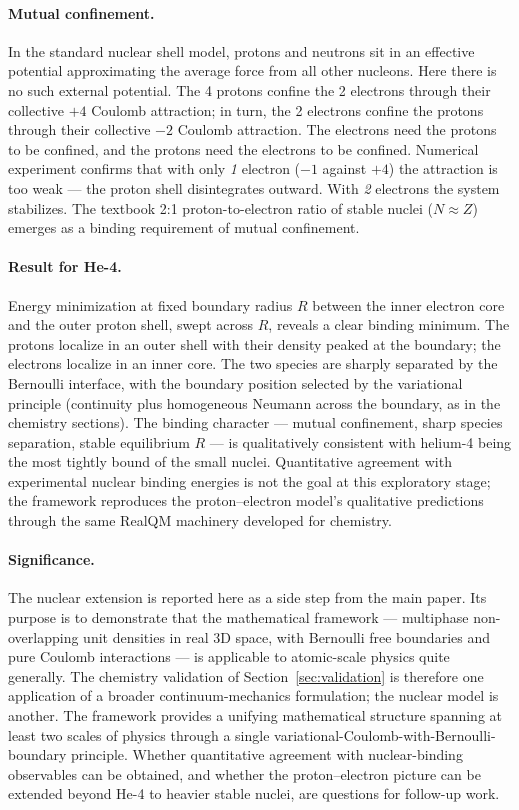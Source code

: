 \documentclass[11pt]{article}
\begin{document}
\paragraph{Mutual confinement.}
In the standard nuclear shell model, protons and neutrons sit in an effective potential approximating the average force from all other nucleons. Here there is no such external potential. The 4 protons confine the 2 electrons through their collective $+4$ Coulomb attraction; in turn, the 2 electrons confine the protons through their collective $-2$ Coulomb attraction. The electrons need the protons to be confined, and the protons need the electrons to be confined. Numerical experiment confirms that with only \emph{1} electron ($-1$ against $+4$) the attraction is too weak --- the proton shell disintegrates outward. With \emph{2} electrons the system stabilizes. The textbook 2:1 proton-to-electron ratio of stable nuclei ($N \approx Z$) emerges as a binding requirement of mutual confinement.

\paragraph{Result for He-4.}
Energy minimization at fixed boundary radius $R$ between the inner electron core and the outer proton shell, swept across $R$, reveals a clear binding minimum. The protons localize in an outer shell with their density peaked at the boundary; the electrons localize in an inner core. The two species are sharply separated by the Bernoulli interface, with the boundary position selected by the variational principle (continuity plus homogeneous Neumann across the boundary, as in the chemistry sections). The binding character --- mutual confinement, sharp species separation, stable equilibrium $R$ --- is qualitatively consistent with helium-4 being the most tightly bound of the small nuclei. Quantitative agreement with experimental nuclear binding energies is not the goal at this exploratory stage; the framework reproduces the proton--electron model's qualitative predictions through the same RealQM machinery developed for chemistry.

\paragraph{Significance.}
The nuclear extension is reported here as a side step from the main paper. Its purpose is to demonstrate that the mathematical framework --- multiphase non-overlapping unit densities in real 3D space, with Bernoulli free boundaries and pure Coulomb interactions --- is applicable to atomic-scale physics quite generally. The chemistry validation of Section~\ref{sec:validation} is therefore one application of a broader continuum-mechanics formulation; the nuclear model is another. The framework provides a unifying mathematical structure spanning at least two scales of physics through a single variational-Coulomb-with-Bernoulli-boundary principle. Whether quantitative agreement with nuclear-binding observables can be obtained, and whether the proton--electron picture can be extended beyond He-4 to heavier stable nuclei, are questions for follow-up work.
\end{document}
